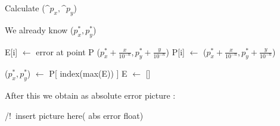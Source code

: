 \documentclass[]{report}
\begin{document}
\begin{algorithm}
	\caption{Calculate ($\^p_x,\^p_y$)}
	\begin{algorithmic} 
		\REQUIRE We already know ($p_x^{*},p_y^{*}$) 
				\\
					\STATE
				
					\STATE E[i] $\leftarrow$ error at point P ($p_x^{*}+\frac{x}{10^{-n}},p_y^{*}+\frac{y}{10^{-n}}$)
					\STATE P[i] $\leftarrow$ ($p_x^{*}+\frac{x}{10^{-n}},p_y^{*}+\frac{y}{10^{-n}}$)
					\STATE
					
					
					
		\ENDFOR
		\ENDFOR
		\STATE ($p_x^{*},p_y^{*}$) $\leftarrow$  P[ index(max(E)) ]
		\STATE E $\leftarrow$ []
		\ENDFOR
		
	\end{algorithmic}
\end{algorithm}



After this we obtain as absolute error picture :

/!\ insert picture here( abs error float)\\
\end{document}
